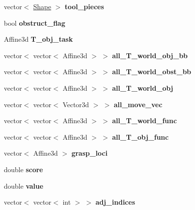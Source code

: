 \begin{DoxyCompactItemize}
vector$<$ \hyperlink{structShape}{Shape} $>$ {\bfseries tool\+\_\+pieces}
\item 
\mbox{\label{classMCT__Search2_a443bb2f6ea5558e6f377eaf814ff9c47}} 
bool {\bfseries obstruct\+\_\+flag}
\item 
\mbox{\label{classMCT__Search2_a797e3e6792e0ea4b3dbf72deb1581d63}} 
Affine3d {\bfseries T\+\_\+obj\+\_\+task}
\item 
\mbox{\label{classMCT__Search2_aa9241908a030cb7da9ec3bae1998bb52}} 
vector$<$ vector$<$ Affine3d $>$ $>$ {\bfseries all\+\_\+\+T\+\_\+world\+\_\+obj\+\_\+bb}
\item 
\mbox{\label{classMCT__Search2_ac04dadebc1088e03c9cec4978123873d}} 
vector$<$ vector$<$ Affine3d $>$ $>$ {\bfseries all\+\_\+\+T\+\_\+world\+\_\+obst\+\_\+bb}
\item 
\mbox{\label{classMCT__Search2_a7047fca52d876a66623a5c7ec3976ff2}} 
vector$<$ vector$<$ Affine3d $>$ $>$ {\bfseries all\+\_\+\+T\+\_\+world\+\_\+obj}
\item 
\mbox{\label{classMCT__Search2_a47e8625c1ab998c604c52e34273653db}} 
vector$<$ vector$<$ Vector3d $>$ $>$ {\bfseries all\+\_\+move\+\_\+vec}
\item 
\mbox{\label{classMCT__Search2_afa879d5e96b9b087611cfe109acda352}} 
vector$<$ vector$<$ Affine3d $>$ $>$ {\bfseries all\+\_\+\+T\+\_\+world\+\_\+func}
\item 
\mbox{\label{classMCT__Search2_a43ab88db1e3c142f386e2a002e844e9d}} 
vector$<$ vector$<$ Affine3d $>$ $>$ {\bfseries all\+\_\+\+T\+\_\+obj\+\_\+func}
\item 
\mbox{\label{classMCT__Search2_ad382344b939acd4978cbe58a0de436a0}} 
vector$<$ Affine3d $>$ {\bfseries grasp\+\_\+loci}
\item 
\mbox{\label{classMCT__Search2_aeb10bb069e90a869860b2abd2d9c6eec}} 
double {\bfseries score}
\item 
\mbox{\label{classMCT__Search2_ad7a1ea07377879ddc5b9fecb32b6d016}} 
double {\bfseries value}
\item 
\mbox{\label{classMCT__Search2_a70ec124e6107095b80c496d1c4700cb7}} 
vector$<$ vector$<$ int $>$ $>$ {\bfseries adj\+\_\+indices}
\end{DoxyCompactItemize}

